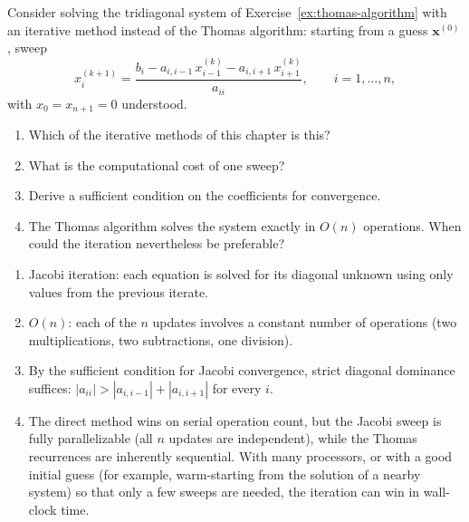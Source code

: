 \begin{exercise} %
    Consider solving the tridiagonal system of Exercise~\ref{ex:thomas-algorithm} with an iterative method instead of the Thomas algorithm: starting from a guess $\mathbf{x}^{(0)}$, sweep
    \begin{equation*}
        x_i^{(k+1)} = \frac{b_i - a_{i,i-1}\, x_{i-1}^{(k)} - a_{i,i+1}\, x_{i+1}^{(k)}}{a_{ii}},
        \qquad i = 1, \dots, n,
    \end{equation*}
    with $x_0 = x_{n+1} = 0$ understood.
    \begin{enumerate}[label=(\alph*)]
        \item Which of the iterative methods of this chapter is this?
        \item What is the computational cost of one sweep?
        \item Derive a sufficient condition on the coefficients for convergence.
        \item The Thomas algorithm solves the system exactly in $O(n)$ operations. When could the iteration nevertheless be preferable?
    \end{enumerate}
\end{exercise}

\begin{solution}
    \begin{enumerate}[label=(\alph*)]
        \item Jacobi iteration: each equation is solved for its diagonal unknown using only values from the previous iterate.
        \item $O(n)$: each of the $n$ updates involves a constant number of operations (two multiplications, two subtractions, one division).
        \item By the sufficient condition for Jacobi convergence, strict diagonal dominance suffices: $|a_{ii}| > |a_{i,i-1}| + |a_{i,i+1}|$ for every $i$.
        \item The direct method wins on serial operation count, but the Jacobi sweep is fully parallelizable (all $n$ updates are independent), while the Thomas recurrences are inherently sequential. With many processors, or with a good initial guess (for example, warm-starting from the solution of a nearby system) so that only a few sweeps are needed, the iteration can win in wall-clock time.
    \end{enumerate}
\end{solution}

